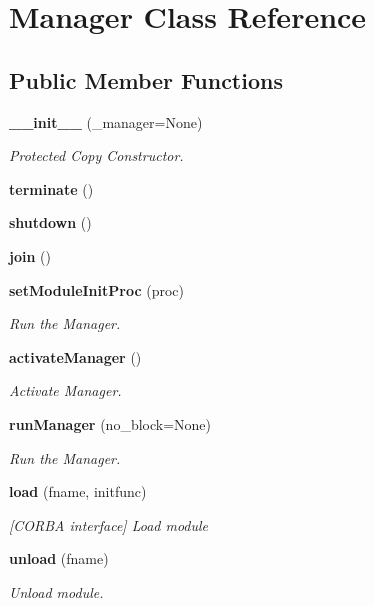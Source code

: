 \section{Manager Class Reference}
\label{classManager}
\subsection*{Public Member Functions}
\begin{CompactItemize}
\item 
{\bf \_\-\_\-init\_\-\_\-} (\_\-manager=None)
\begin{CompactList}\small\item\em Protected Copy Constructor. \item\end{CompactList}\item 
{\bf terminate} ()
\item 
{\bf shutdown} ()
\item 
{\bf join} ()
\item 
{\bf set\-Module\-Init\-Proc} (proc)
\begin{CompactList}\small\item\em Run the Manager. \item\end{CompactList}\item 
{\bf activate\-Manager} ()
\begin{CompactList}\small\item\em Activate Manager. \item\end{CompactList}\item 
{\bf run\-Manager} (no\_\-block=None)
\begin{CompactList}\small\item\em Run the Manager. \item\end{CompactList}\item 
{\bf load} (fname, initfunc)
\begin{CompactList}\small\item\em [CORBA interface] Load module \item\end{CompactList}\item 
{\bf unload} (fname)
\begin{CompactList}\small\item\em Unload module. \item\end{CompactList}\item 

\end{CompactItemize}
